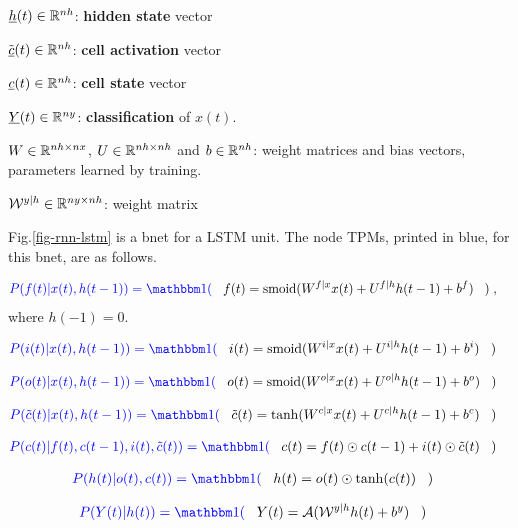 ${\underline{h}}(t)\in { \mathbb{R}}^{nh}$:
{\bf hidden state} vector

${\tilde {{\underline{c}}}}(t)\in { \mathbb{R}}^{nh}$:
{\bf cell activation} vector

${\underline{c}}(t)\in { \mathbb{R}}^{nh}$:
{\bf cell state} vector

${\underline{Y}}(t)\in { \mathbb{R}}^{ny}$:
{\bf classification} of $x(t)$.

$W\in { \mathbb{R}}^{nh\times nx}$,
$U\in { \mathbb{R}}^{nh\times nh}$
and 
$b\in { \mathbb{R}}^{nh}$:
weight matrices and bias vectors,
 parameters learned by training.

${\cal W}^{y|h}\in { \mathbb{R}}^{ny\times nh}$:
 weight matrix


Fig.\ref{fig-rnn-lstm}
is a bnet
for a LSTM unit.
The node TPMs, printed in blue,
for this bnet, are
as follows.

\begin{align}\color{blue}
P(f(t)|x(t), h(t-1))=\indi(\;\;\;&
f(t)=\smoid(W^{f|x}x(t)+
U^{f|h}h(t-1)+b^{f})
\;\;\;)
\;,
\end{align}
where $h(-1)=0$.

\begin{align}\color{blue}
P(i(t)|x(t), h(t-1))=\indi(\;\;\;&
i(t)=\smoid(W^{i|x}x(t)
+U^{i|h}h(t-1)+b^{i})
\;\;\;)
\end{align}

\begin{align}\color{blue}
P(o(t)|x(t), h(t-1))=\indi(\;\;\;&
o(t)=\smoid(W^{o|x}x(t)
+U^{o|h}h(t-1)+b^{o})
\;\;\;)
\end{align}

\begin{align}\color{blue}
P(\tilde{c}(t)|x(t), h(t-1))=\indi(\;\;\;&
\tilde{c}(t)=\tanh
(W^{c|x}x(t)+U^{c|h}h(t-1)+b^{c})
\;\;\;)
\end{align}

\begin{align}\color{blue}
P(c(t)|f(t), c(t-1), i(t),
 \tilde{c}(t))
=\indi(\;\;\;&
c(t)=f(t)\odot c(t-1)+
i(t)\odot {\tilde {c}}(t)
\;\;\;)
\end{align}

\begin{align}\color{blue}
P(h(t)|o(t), c(t))=\indi(\;\;\;&
h(t)=o(t)\odot \tanh
(c(t))
\;\;\;)
\end{align}



\begin{align}\color{blue}
P(Y(t)|h(t))=\indi(\;\;\;&
Y(t)= \cala(\calw^{y|h}h(t) + b^y)
\;\;\;)
\end{align}

